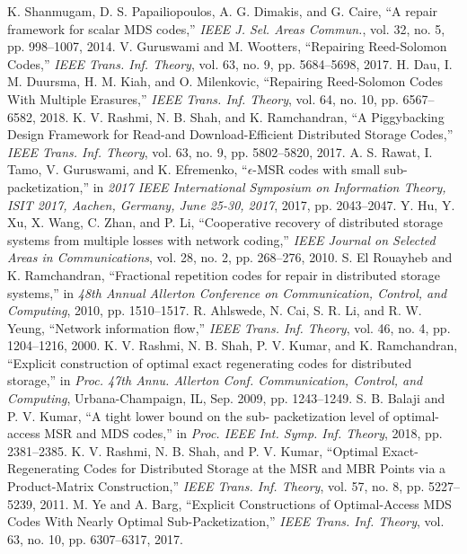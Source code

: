 \begin{multicols}{2}
\begin{thebibliography}{99}
 K. Shanmugam, D. S. Papailiopoulos, A. G. Dimakis, and G. Caire, ``A repair framework for scalar MDS codes,'' \textit{IEEE J. Sel. Areas Commun.}, vol. 32, no. 5, pp. 998--1007, 2014.
 V. Guruswami and M. Wootters, ``Repairing Reed-Solomon Codes,'' \textit{IEEE Trans. Inf. Theory}, vol. 63, no. 9, pp. 5684--5698, 2017.
 H. Dau, I. M. Duursma, H. M. Kiah, and O. Milenkovic, ``Repairing Reed-Solomon Codes With Multiple Erasures,'' \textit{IEEE Trans. Inf. Theory}, vol. 64, no. 10, pp. 6567--6582, 2018.
 K. V. Rashmi, N. B. Shah, and K. Ramchandran, ``A Piggybacking Design Framework for Read-and Download-Efficient Distributed Storage Codes,'' \textit{IEEE Trans. Inf. Theory}, vol. 63, no. 9, pp. 5802--5820, 2017.
 A. S. Rawat, I. Tamo, V. Guruswami, and K. Efremenko, ``$\epsilon$-MSR codes with small sub-
packetization,'' in \textit{2017 IEEE International Symposium on Information Theory, ISIT 2017, Aachen, Germany, June 25-30, 2017}, 2017, pp. 2043--2047.
 Y. Hu, Y. Xu, X. Wang, C. Zhan, and P. Li, ``Cooperative recovery of distributed storage systems from multiple losses with network coding,'' \textit{IEEE Journal on Selected Areas in Communications}, vol. 28, no. 2, pp. 268--276, 2010.
 S. El Rouayheb and K. Ramchandran, ``Fractional repetition codes for repair in distributed
storage systems,'' in \textit{48th Annual Allerton Conference on Communication, Control, and Computing}, 2010, pp. 1510--1517.
 R. Ahlswede, N. Cai, S. R. Li, and R. W. Yeung, ``Network information flow,'' \textit{IEEE Trans. Inf. Theory}, vol. 46, no. 4, pp. 1204--1216, 2000.
 K. V. Rashmi, N. B. Shah, P. V. Kumar, and K. Ramchandran, ``Explicit construction of optimal exact regenerating codes for distributed storage,'' in \textit{Proc. 47th Annu. Allerton Conf. Communication, Control, and Computing}, Urbana-Champaign, IL, Sep. 2009, pp. 1243--1249.
 S. B. Balaji and P. V. Kumar, ``A tight lower bound on the sub- packetization level of optimal-access MSR and MDS codes,'' in \textit{Proc. IEEE Int. Symp. Inf. Theory}, 2018, pp. 2381--2385.
 K. V. Rashmi, N. B. Shah, and P. V. Kumar, ``Optimal Exact-Regenerating Codes for Distributed Storage at the MSR and MBR Points via a Product-Matrix Construction,'' \textit{IEEE Trans. Inf. Theory}, vol. 57, no. 8, pp. 5227--5239, 2011.
 M. Ye and A. Barg, ``Explicit Constructions of Optimal-Access MDS Codes With Nearly Optimal Sub-Packetization,'' \textit{IEEE Trans. Inf. Theory}, vol. 63, no. 10, pp. 6307--6317, 2017.

\end{thebibliography}
\end{multicols}
